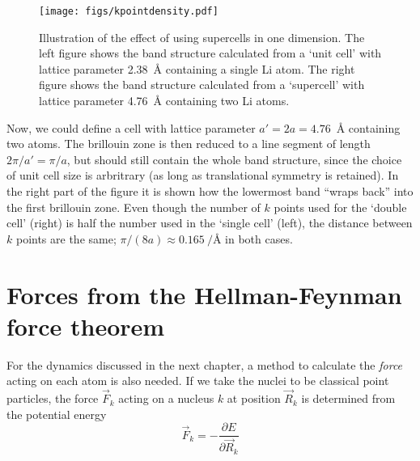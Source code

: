 \documentclass[11pt,bibliography=totoc,index=totoc]{scrbook}   %
\begin{document}
\begin{figure}[htbp]
  \centering
  \texttt{[image: figs/kpointdensity.pdf]}
  \caption{Illustration of the effect of using supercells in one dimension. 
  The left figure shows the band structure calculated from a `unit cell' with
  lattice parameter 2.38~Å containing a single Li atom.
  The right figure shows the band structure calculated from a `supercell' with
  lattice parameter 4.76~Å containing two Li atoms.}
  \label{fig:kpointdensities}
\end{figure}

Now, we could define a
cell with lattice parameter $a'=2a=4.76$~Å containing two atoms. 
The brillouin zone is then reduced to a line segment of length $2\pi/a'=\pi/a$,
but should still contain the whole band structure, since the choice of unit cell size is arbritrary (as long as translational symmetry is retained).
In the right part of the figure it is shown how the lowermost band ``wraps back'' into the first brillouin zone.
Even though the number of $k$ points used for the `double cell' (right) is half the number used in the `single cell' (left), 
the distance between $k$ points are the same; $\pi/(8a)\approx \SI{0.165}{\per\angstrom}$ in both cases.


%
\section{Forces from the Hellman-Feynman force theorem}\label{sec:forcetheorem}
%

For the dynamics discussed in the next chapter, a method to calculate the \emph{force} acting on each atom is also needed. 
If we take the nuclei to be classical point particles, 
the force $\vec{F}_k$ acting on a nucleus $k$ at position $\vec{R}_k$ is determined from the potential energy 
\begin{equation}
  \vec{F}_k = -\frac{\partial E}{\partial\vec{R}_k}
\end{equation}
\end{document}
